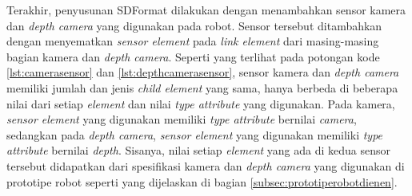 



Terakhir, penyusunan SDFormat dilakukan dengan menambahkan sensor kamera dan \emph{depth camera} yang digunakan pada robot.
Sensor tersebut ditambahkan dengan menyematkan \emph{sensor element} pada \emph{link element} dari masing-masing bagian kamera dan \emph{depth camera}.
Seperti yang terlihat pada potongan kode \ref{lst:camerasensor} dan \ref{lst:depthcamerasensor},
  sensor kamera dan \emph{depth camera} memiliki jumlah dan jenis \emph{child element} yang sama,
  hanya berbeda di beberapa nilai dari setiap \emph{element} dan nilai \emph{type attribute} yang digunakan.
  Pada kamera, \emph{sensor element} yang digunakan memiliki \emph{type attribute} bernilai \emph{camera},
  sedangkan pada \emph{depth camera}, \emph{sensor element} yang digunakan memiliki \emph{type attribute} bernilai \emph{depth}.
  Sisanya, nilai setiap \emph{element} yang ada di kedua sensor tersebut didapatkan dari spesifikasi kamera dan \emph{depth camera} yang digunakan di prototipe robot seperti yang dijelaskan di bagian \ref{subsec:prototiperobotdienen}.


